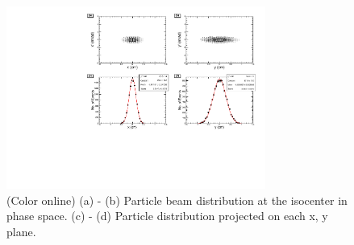 \documentclass[jkps,preprint,fleqn,showpacs,showkeys]{revtex4}
\begin{document}
\begin{figure}[h]
  \begin{center}
    \includegraphics[width=8.5cm]{Fig04.pdf}
    \caption{(Color online) (a) - (b) Particle beam distribution at the isocenter in phase space. (c) - (d) Particle distribution projected on each x, y plane.}
    \label{fig3}
  \end{center}
\end{figure}
\end{document}
